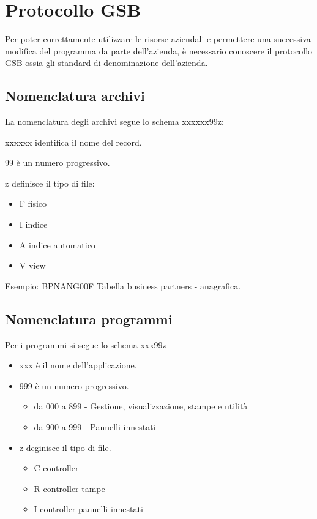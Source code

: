 \documentclass[target=bach,aauheader=,style=]{thud}
\begin{document}
\appendix


\chapter{Protocollo GSB}

Per poter correttamente utilizzare le risorse aziendali e permettere una successiva modifica del programma da parte dell'azienda, è necessario conoscere il protocollo GSB ossia gli standard di denominazione dell'azienda.
\section{Nomenclatura archivi}
La nomenclatura degli archivi segue lo schema xxxxxx99z:

xxxxxx identifica il nome del record.

99 è un numero progressivo.

z definisce il tipo di file:
\begin{itemize}
    \item F fisico
    \item I indice
    \item A indice automatico
    \item V view
\end{itemize}

Esempio: BPNANG00F Tabella business partners - anagrafica.

\section{Nomenclatura programmi}
Per i programmi si segue lo schema xxx99z

\begin{itemize}
    \item xxx è il nome dell'applicazione.

    \item 999 è un numero progressivo.
    \begin{itemize}
        \item da 000 a 899 - Gestione, visualizzazione, stampe e utilità
        \item da 900 a 999 - Pannelli innestati
    \end{itemize}

    \item z deginisce il tipo di file.
    \begin{itemize}
        \item C controller
        \item R controller tampe
        \item I controller pannelli innestati
    \end{itemize}
\end{itemize}
\end{document}
